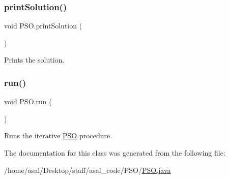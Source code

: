 \subsubsection{\texorpdfstring{print\+Solution()}{printSolution()}}
{\footnotesize\ttfamily void P\+S\+O.\+print\+Solution (\begin{DoxyParamCaption}{ }\end{DoxyParamCaption})}

Prints the solution. \mbox{\label{class_p_s_o_a689d26e00d138c809a4de0a34e98cd0a}} 
\subsubsection{\texorpdfstring{run()}{run()}}
{\footnotesize\ttfamily void P\+S\+O.\+run (\begin{DoxyParamCaption}{ }\end{DoxyParamCaption})}

Runs the iterative \hyperlink{class_p_s_o}{P\+SO} procedure. 

The documentation for this class was generated from the following file\+:\begin{DoxyCompactItemize}
\item 
/home/asal/\+Desktop/staff/asal\+\_\+code/\+P\+S\+O/\hyperlink{_p_s_o_8java}{P\+S\+O.\+java}\end{DoxyCompactItemize}
